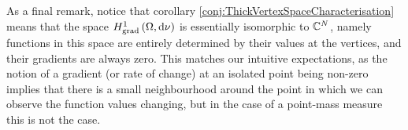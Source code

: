 \documentclass[11pt]{report}
\begin{document}
As a final remark, notice that corollary \ref{conj:ThickVertexSpaceCharacterisation} means that the space $H^1_\mathrm{grad}\left( \Omega, \mathrm{d}\nu \right)$ is essentially isomorphic to $\mathbb{C}^N$, namely functions in this space are entirely determined by their values at the vertices, and their gradients are always zero.
This matches our intuitive expectations, as the notion of a gradient (or rate of change) at an isolated point being non-zero implies that there is a small neighbourhood around the point in which we can observe the function values changing, but in the case of a point-mass measure this is not the case.
\end{document}
